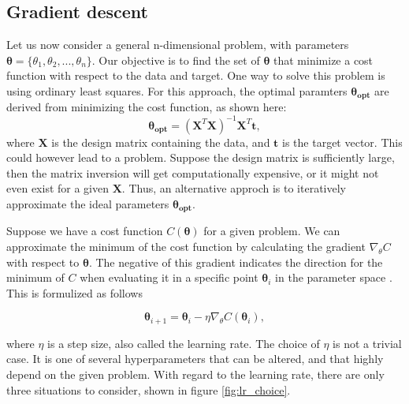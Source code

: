 \subsection*{Gradient descent}
Let us now consider a general n-dimensional problem, with parameters $\boldsymbol{\theta} = \{\theta_1, \theta_2, ..., \theta_n\}$. 
Our objective is to find the set of $\boldsymbol{\theta}$ that minimize a cost function with respect to the data and target. 
One way to solve this problem is using ordinary least squares. For this approach, 
the optimal paramters $\boldsymbol{\theta_{opt}}$ are derived from minimizing the cost function, as shown here:
\begin{equation*}
    \boldsymbol{\theta_{opt}} = (\boldsymbol{X}^T\boldsymbol{X})^{-1}\boldsymbol{X}^T\boldsymbol{t},
\end{equation*}
where $\boldsymbol{X}$ is the design matrix containing the data, and $\boldsymbol{t}$ is the target vector. This could however lead to a problem. 
Suppose the design matrix is sufficiently large, then the matrix inversion will get 
computationally expensive, or it might not even exist for a given $\boldsymbol{X}$. 
Thus, an alternative approch is to iteratively approximate the ideal parameters $\boldsymbol{\theta_{opt}}$. \par 
Suppose we have a cost function $C(\boldsymbol{\theta})$ for a given problem. We can approximate the minimum of 
the cost function by calculating the gradient $\nabla_{\theta}C$ with respect to $\boldsymbol{\theta}$. 
The negative of this gradient indicates the direction for the minimum of $C$ when evaluating 
it in a specific point $\boldsymbol{\theta}_i$ in the parameter space \cite{FYSSTK}. This is formulized as follows 

\begin{equation}\label{eq:grad}
    \boldsymbol{\theta}_{i+1} = \boldsymbol{\theta}_i - \eta\nabla_{\theta}C(\boldsymbol{\theta}_i),
\end{equation}

where $\eta$ is a step size, also called the learning rate. The choice of $\eta$ is not a trivial case. It is one of several 
hyperparameters\cite{Goodfellow-et-al-2016} that can be altered, and that highly depend on the given problem. 
With regard to the learning rate, there are only three situations to consider, shown in figure \ref{fig:lr_choice}.

